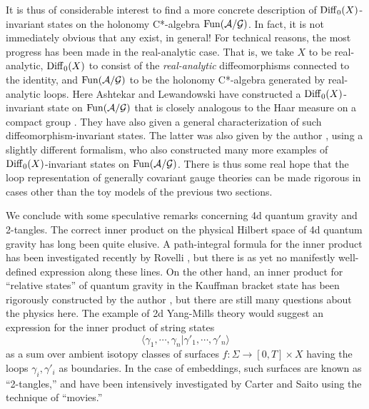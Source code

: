 \documentclass[12pt]{article}
\newcommand{\maps}{\colon}
\newcommand{\A}{{\cal A}}
\newcommand{\G}{{\cal G}}
\newcommand{\Diff}{{\rm Diff}}
\newcommand{\Fun}{{\rm Fun}}
\begin{document}
It is thus of considerable interest to find a more concrete description of
$\Diff_0(X)$-invariant states on the holonomy C*-algebra $\Fun(\A/\G)$.  In
fact, it is not immediately obvious that any exist, in general! For
technical reasons, the most progress has been made in the real-analytic
case.  That is, we take $X$ to be real-analytic, $\Diff_0(X)$  to consist
of the {\it real-analytic} diffeomorphisms connected to the identity, and
$\Fun(\A/\G)$ to be the holonomy C*-algebra generated by real-analytic
loops.  Here Ashtekar and Lewandowski have constructed a
$\Diff_0(X)$-invariant state on $\Fun(\A/\G)$ that is closely analogous to
the Haar measure on a compact group \cite{AL}.  They have also given a
general characterization of such diffeomorphism-invariant states.  The
latter was also given by the author \cite{Baez}, using a slightly different
formalism, who also constructed many more examples of
$\Diff_0(X)$-invariant states on $\Fun(\A/\G)$.   There is thus some real
hope that the loop representation of generally covariant gauge theories can
be made rigorous in cases other than the toy models of the previous two
sections.

We conclude with some speculative remarks concerning 4d quantum gravity and
2-tangles.  The correct inner product on the physical Hilbert space of 4d
quantum gravity has long been quite elusive.   A path-integral formula for
the inner product  has been investigated recently by Rovelli
\cite{Rovelli}, but there is as yet no manifestly well-defined
expression along these lines. On the other hand, an inner product for
``relative states'' of quantum gravity in the Kauffman bracket state has
been rigorously constructed by the author \cite{BaezTang}, but there are
still many questions about the physics here. The example of 2d Yang-Mills
theory would suggest an expression for the inner product of string states
\[           \langle \gamma_1, \cdots, \gamma_n | \gamma'_1, \cdots,
\gamma'_n\rangle  \] as a sum over ambient isotopy classes of surfaces $f
\maps \Sigma \to [0,T] \times X$ having  the loops $\gamma_i, \gamma'_i$ as
boundaries.   In the case of embeddings, such surfaces are known as
``2-tangles,'' and have been intensively investigated by Carter and Saito
\cite{Carter-Saito} using the technique of ``movies.''
\end{document}
